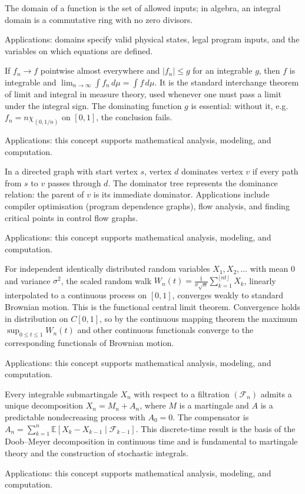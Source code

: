 The domain of a function is the set of allowed inputs; in algebra, an integral domain is a commutative ring with no zero divisors. \par\noindent Applications: domains specify valid physical states, legal program inputs, and the variables on which equations are defined.

If $f_n \to f$ pointwise almost everywhere and $|f_n| \leq g$ for an integrable $g$, then $f$ is integrable and $\lim_{n \to \infty} \int f_n\,d\mu = \int f\,d\mu$. It is the standard interchange theorem of limit and integral in measure theory, used whenever one must pass a limit under the integral sign. The dominating function $g$ is essential: without it, e.g. $f_n = n\chi_{(0,1/n)}$ on $[0,1]$, the conclusion fails. \par\noindent Applications: this concept supports mathematical analysis, modeling, and computation.

In a directed graph with start vertex $s$, vertex $d$ dominates vertex $v$ if every path from $s$ to $v$ passes through $d$. The dominator tree represents the dominance relation: the parent of $v$ is its immediate dominator. Applications include compiler optimisation (program dependence graphs), flow analysis, and finding critical points in control flow graphs. \par\noindent Applications: this concept supports mathematical analysis, modeling, and computation.

For independent identically distributed random variables $X_1, X_2, \ldots$ with mean $0$ and variance $\sigma^2$, the scaled random walk $W_n(t) = \frac{1}{\sigma\sqrt{n}} \sum_{k=1}^{\lfloor nt \rfloor} X_k$, linearly interpolated to a continuous process on $[0,1]$, converges weakly to standard Brownian motion. This is the functional central limit theorem. Convergence holds in distribution on $C[0,1]$, so by the continuous mapping theorem the maximum $\sup_{0 \le t \le 1} W_n(t)$ and other continuous functionals converge to the corresponding functionals of Brownian motion. \par\noindent Applications: this concept supports mathematical analysis, modeling, and computation.

Every integrable submartingale $X_n$ with respect to a filtration $(\mathcal{F}_n)$ admits a unique decomposition $X_n = M_n + A_n$, where $M$ is a martingale and $A$ is a predictable nondecreasing process with $A_0 = 0$. The compensator is $A_n = \sum_{k=1}^n \mathbb{E}[X_k - X_{k-1} \mid \mathcal{F}_{k-1}]$. This discrete-time result is the basis of the Doob--Meyer decomposition in continuous time and is fundamental to martingale theory and the construction of stochastic integrals. \par\noindent Applications: this concept supports mathematical analysis, modeling, and computation.

